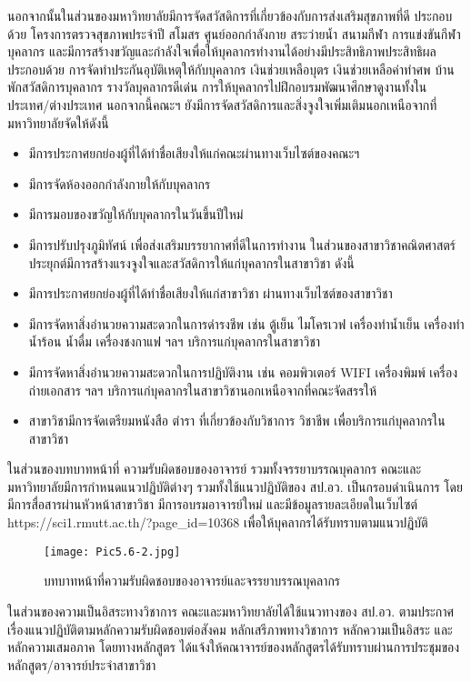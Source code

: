 นอกจากนั้นในส่วนของมหาวิทยาลัยมีการจัดสวัสดิการที่เกี่ยวข้องกับการส่งเสริมสุขภาพที่ดี ประกอบด้วย
โครงการตรวจสุขภาพประจำปี สโมสร ศูนย์ออกกำลังกาย สระว่ายน้ำ สนามกีฬา การแข่งขันกีฬาบุคลากร และมีการสร้างขวัญและกำลังใจเพื่อให้บุคลากรทำงานได้อย่างมีประสิทธิภาพประสิทธิผล ประกอบด้วย การจัดทำประกันอุบัติเหตุให้กับบุคลากร เงินช่วยเหลือบุตร เงินช่วยเหลือค่าทำศพ บ้านพักสวัสดิการบุคลากร รางวัลบุคลากรดีเด่น การให้บุคลากรไปฝึกอบรมพัฒนาศึกษาดูงานทั้งในประเทศ/ต่างประเทศ นอกจากนี้คณะฯ ยังมีการจัดสวัสดิการและสิ่งจูงใจเพิ่มเติมนอกเหนือจากที่มหาวิทยาลัยจัดให้ดังนี้    
\begin{itemize}   
\item มีการประกาศยกย่องผู้ที่ได้ทำชื่อเสียงให้แก่คณะผ่านทางเว็บไซต์ของคณะฯ  
\item มีการจัดห้องออกกำลังกายให้กับบุคลากร 
\item มีการมอบของขวัญให้กับบุคลากรในวันขึ้นปีใหม่  
\item มีการปรับปรุงภูมิทัศน์ เพื่อส่งเสริมบรรยากาศที่ดีในการทำงาน
ในส่วนของสาขาวิชาคณิตศาสตร์ประยุกต์มีการสร้างแรงจูงใจและสวัสดิการให้แก่บุคลากรในสาขาวิชา ดังนี้
\item มีการประกาศยกย่องผู้ที่ได้ทำชื่อเสียงให้แก่สาขาวิชา ผ่านทางเว็บไซต์ของสาขาวิชา
\item มีการจัดหาสิ่งอำนวยความสะดวกในการดำรงชีพ เช่น ตู้เย็น ไมโครเวฟ เครื่องทำน้ำเย็น เครื่องทำ     น้ำร้อน น้ำดื่ม เครื่องชงกาแฟ ฯลฯ บริการแก่บุคลากรในสาขาวิชา
\item มีการจัดหาสิ่งอำนวยความสะดวกในการปฏิบัติงาน เช่น คอมพิวเตอร์ WIFI เครื่องพิมพ์ เครื่องถ่ายเอกสาร ฯลฯ บริการแก่บุคลากรในสาขาวิชานอกเหนือจากที่คณะจัดสรรให้
\item สาขาวิชามีการจัดเตรียมหนังสือ ตำรา ที่เกี่ยวข้องกับวิชาการ วิชาชีพ เพื่อบริการแก่บุคลากรในสาขาวิชา
\end{itemize}

ในส่วนของบทบาทหน้าที่ ความรับผิดชอบของอาจารย์ รวมทั้งจรรยาบรรณบุคลากร คณะและมหาวิทยาลัยมีการกำหนดแนวปฏิบัติต่างๆ รวมทั้งใช้แนวปฏิบัติของ สป.อว. เป็นกรอบดำเนินการ โดยมีการสื่อสารผ่านหัวหน้าสาขาวิชา มีการอบรมอาจารย์ใหม่ และมีข้อมูลรายละเอียดในเว็บไซต์ https://sci1.rmutt.ac.th/?page\_id=10368  เพื่อให้บุคลากรได้รับทราบตามแนวปฏิบัติ

\begin{figure}[h!]
	\texttt{[image: Pic5.6-2.jpg]}
	\caption{บทบาทหน้าที่ความรับผิดชอบของอาจารย์และจรรยาบรรณบุคลากร}
	\label{Pic5.6-2}
\end{figure}
ในส่วนของความเป็นอิสระทางวิชาการ คณะและมหาวิทยาลัยได้ใช้แนวทางของ สป.อว. ตามประกาศเรื่องแนวปฏิบัติตามหลักความรับผิดชอบต่อสังคม หลักเสรีภาพทางวิชาการ หลักความเป็นอิสระ และหลักความเสมอภาค โดยทางหลักสูตร ได้แจ้งให้คณาจารย์ของหลักสูตรได้รับทราบผ่านการประชุมของหลักสูตร/อาจารย์ประจำสาขาวิชา
\begin{doclist}
\end{doclist}

